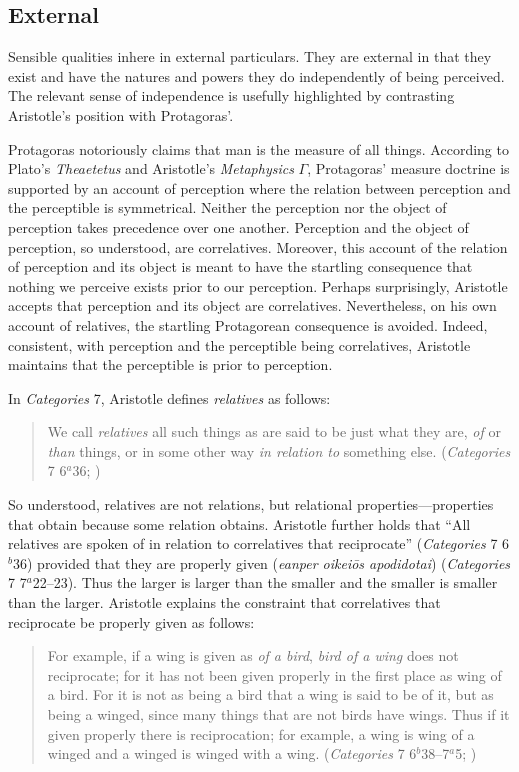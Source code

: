 \subsection{External} %
\label{sub:external}

Sensible qualities inhere in external particulars. They are external in that they exist and have the natures and powers they do independently of being perceived. The relevant sense of independence is usefully highlighted by contrasting Aristotle's position with Protagoras'.

Protagoras notoriously claims that man is the measure of all things. According to Plato's \emph{Theaetetus} and Aristotle's \emph{Metaphysics} \( \Gamma \), Protagoras' measure doctrine is supported by an account of perception where the relation between perception and the perceptible is symmetrical. Neither the perception nor the object of perception takes precedence over one another. Perception and the object of perception, so understood, are correlatives. Moreover, this account of the relation of perception and its object is meant to have the startling consequence that nothing we perceive exists prior to our perception. Perhaps surprisingly, Aristotle accepts that perception and its object are correlatives. Nevertheless, on his own account of relatives, the startling Protagorean consequence is avoided. Indeed, consistent, with perception and the perceptible being correlatives, Aristotle maintains that the perceptible is prior to perception.

In \emph{Categories} 7, Aristotle defines \emph{relatives} as follows:
\begin{quote}
    We call \emph{relatives} all such things as are said to be just what they are, \emph{of} or \emph{than} things, or in some other way \emph{in relation to} something else. (\emph{Categories} 7 6\( ^{a} \)36; \citealt{Ackrill:1963fk})
\end{quote}
So understood, relatives are not relations, but relational properties---properties that obtain because some relation obtains. Aristotle further holds that ``All relatives are spoken of in relation to correlatives that reciprocate'' (\emph{Categories} 7 6\( ^{b} \)36) provided that they are properly given (\emph{eanper oikeiōs apodidotai}) (\emph{Categories} 7 7\( ^{a} \)22--23). Thus the larger is larger than the smaller and the smaller is smaller than the larger. Aristotle explains the constraint that correlatives that reciprocate be properly given as follows:
\begin{quote}
    For example, if a wing is given as \emph{of a bird}, \emph{bird of a wing} does not reciprocate; for it has not been given properly in the first place as wing of a bird. For it is not as being a bird that a wing is said to be of it, but as being a winged, since many things that are not birds have wings. Thus if it given properly there is reciprocation; for example, a wing is wing of a winged and a winged is winged with a wing. (\emph{Categories} 7 6\( ^{b} \)38--7\( ^{a} \)5; \citealt{Ackrill:1963fk})
\end{quote}

